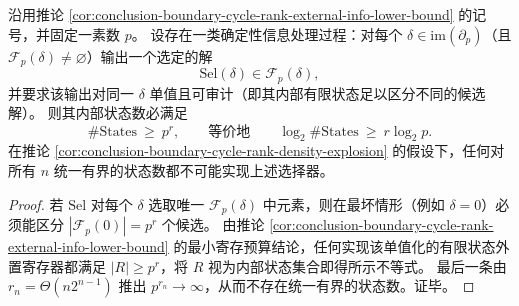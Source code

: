 \begin{corollary}\label{cor:conclusion-canonical-lift-selector-memory-lb}
沿用推论 \ref{cor:conclusion-boundary-cycle-rank-external-info-lower-bound} 的记号，并固定一素数 \(p\)。
设存在一类确定性信息处理过程：对每个 \(\delta\in\mathrm{im}(\partial_p)\)（且 \(\mathcal F_p(\delta)\neq\varnothing\)）输出一个选定的解
\[
\mathrm{Sel}(\delta)\in \mathcal F_p(\delta),
\]
并要求该输出对同一 \(\delta\) 单值且可审计（即其内部有限状态足以区分不同的候选解）。
则其内部状态数必满足
\[
\#\mathrm{States}\ \ge\ p^{r},
\qquad\text{等价地}\qquad
\log_2\#\mathrm{States}\ \ge\ r\log_2 p.
\]
在推论 \ref{cor:conclusion-boundary-cycle-rank-density-explosion} 的假设下，任何对所有 \(n\) 统一有界的状态数都不可能实现上述选择器。
\end{corollary}
\begin{proof}
若 \(\mathrm{Sel}\) 对每个 \(\delta\) 选取唯一 \(\mathcal F_p(\delta)\) 中元素，则在最坏情形（例如 \(\delta=0\)）必须能区分 \(|\mathcal F_p(0)|=p^r\) 个候选。
由推论 \ref{cor:conclusion-boundary-cycle-rank-external-info-lower-bound} 的最小寄存预算结论，任何实现该单值化的有限状态外置寄存器都满足 \(|R|\ge p^r\)，将 \(R\) 视为内部状态集合即得所示不等式。
最后一条由 \(r_n=\Theta(n2^{n-1})\) 推出 \(p^{r_n}\to\infty\)，从而不存在统一有界的状态数。证毕。
\end{proof}

